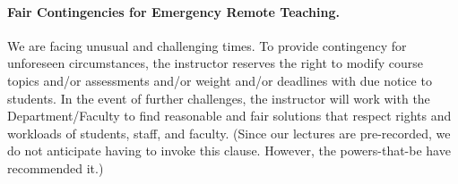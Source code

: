 \documentclass[letterpaper,10pt]{article}
\begin{document}






\paragraph{Fair Contingencies for Emergency Remote Teaching.}
We are facing unusual and challenging times. To provide contingency for unforeseen circumstances, the instructor reserves the right to modify course topics and/or assessments and/or weight and/or deadlines with due notice to students. In the event of further challenges, the instructor will work with the Department/Faculty to find reasonable and fair solutions that respect rights and workloads of students, staff, and faculty. (Since our lectures are pre-recorded, we do not anticipate having to invoke this clause. However, the powers-that-be have recommended it.)
\end{document}
